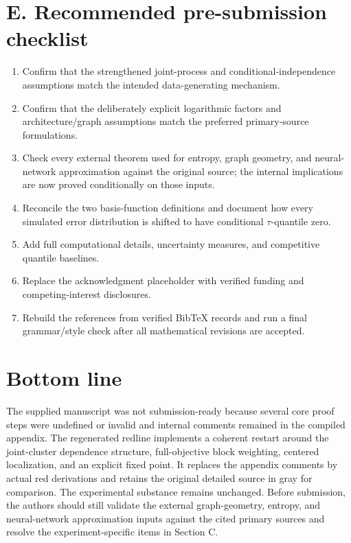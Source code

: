 \documentclass[11pt]{article}
\begin{document}
\section*{E. Recommended pre-submission checklist}
\begin{enumerate}[leftmargin=2em]
\item Confirm that the strengthened joint-process and conditional-independence assumptions match the intended data-generating mechanism.
\item Confirm that the deliberately explicit logarithmic factors and architecture/graph assumptions match the preferred primary-source formulations.
\item Check every external theorem used for entropy, graph geometry, and neural-network approximation against the original source; the internal implications are now proved conditionally on those inputs.
\item Reconcile the two basis-function definitions and document how every simulated error distribution is shifted to have conditional $\tau$-quantile zero.
\item Add full computational details, uncertainty measures, and competitive quantile baselines.
\item Replace the acknowledgment placeholder with verified funding and competing-interest disclosures.
\item Rebuild the references from verified BibTeX records and run a final grammar/style check after all mathematical revisions are accepted.
\end{enumerate}

\section*{Bottom line}
The supplied manuscript was not submission-ready because several core proof steps were undefined or invalid and internal comments remained in the compiled appendix. The regenerated redline implements a coherent restart around the joint-cluster dependence structure, full-objective block weighting, centered localization, and an explicit fixed point. It replaces the appendix comments by actual red derivations and retains the original detailed source in gray for comparison. The experimental substance remains unchanged. Before submission, the authors should still validate the external graph-geometry, entropy, and neural-network approximation inputs against the cited primary sources and resolve the experiment-specific items in Section C.
\end{document}
